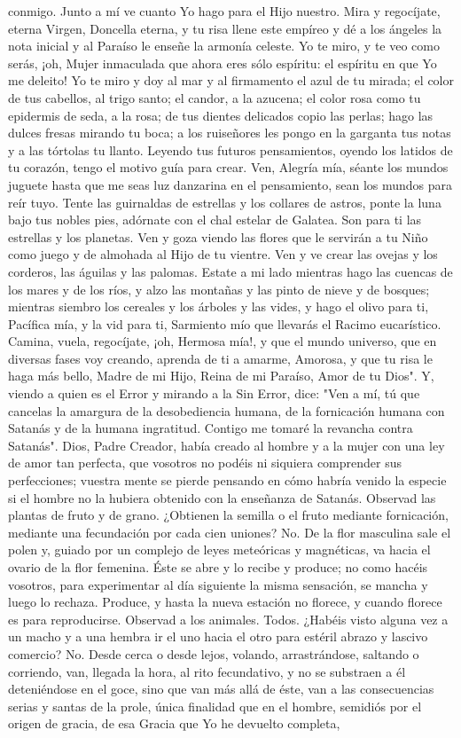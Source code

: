 \documentclass[12pt, twoside, openright]{book} %
\begin{document}
conmigo. Junto a mí ve cuanto Yo hago para el Hijo nuestro. Mira y regocíjate, eterna Virgen, Doncella eterna, y tu risa llene este empíreo y dé a los ángeles la nota inicial y al Paraíso le enseñe la armonía celeste. Yo te miro, y te veo como serás, ¡oh, Mujer inmaculada que ahora eres sólo espíritu: el espíritu en que Yo me deleito! Yo te miro y doy al mar y al firmamento el azul de tu mirada; el color de tus cabellos, al trigo santo; el candor, a la azucena; el color rosa como tu epidermis de seda, a la rosa; de tus dientes delicados copio las perlas; hago las dulces fresas mirando tu boca; a los ruiseñores les pongo en la garganta tus notas y a las tórtolas tu llanto. Leyendo tus futuros pensamientos, oyendo los latidos de tu corazón, tengo el motivo guía para crear. Ven, Alegría mía, séante los mundos juguete hasta que me seas luz danzarina en el pensamiento, sean los mundos para reír tuyo. Tente las guirnaldas de estrellas y los collares de astros, ponte la luna bajo tus nobles pies, adórnate con el chal estelar de Galatea. Son para ti las estrellas y los planetas. Ven y goza viendo las flores que le servirán a tu Niño como juego y de almohada al Hijo de tu vientre. Ven y ve crear las ovejas y los corderos, las águilas y las palomas. Estate a mi lado mientras hago las cuencas de los mares y de los ríos, y alzo las montañas y las pinto de nieve y de bosques; mientras siembro los cereales y los árboles y las vides, y hago el olivo para ti, Pacífica mía, y la vid para ti, Sarmiento mío que llevarás el Racimo eucarístico. Camina, vuela, regocíjate, ¡oh, Hermosa mía!, y que el mundo universo, que en diversas fases voy creando, aprenda de ti a amarme, Amorosa, y que tu risa le haga más bello, Madre de mi Hijo, Reina de mi Paraíso, Amor de tu Dios". Y, viendo a quien es el Error y mirando a la Sin Error, dice: "Ven a mí, tú que cancelas la amargura de la desobediencia humana, de la fornicación humana con Satanás y de la humana ingratitud. Contigo me tomaré la revancha contra Satanás". Dios, Padre Creador, había creado al hombre y a la mujer con una ley de amor tan perfecta, que vosotros no podéis ni siquiera comprender sus perfecciones; vuestra mente se pierde pensando en cómo habría venido la especie si el hombre no la hubiera obtenido con la enseñanza de Satanás. Observad las plantas de fruto y de grano. ¿Obtienen la semilla o el fruto mediante fornicación, mediante una fecundación por cada cien uniones? No. De la flor masculina sale el polen y, guiado por un complejo de leyes meteóricas y magnéticas, va hacia el ovario de la flor femenina. Éste se abre y lo recibe y produce; no como hacéis vosotros, para experimentar al día siguiente la misma sensación, se mancha y luego lo rechaza. Produce, y hasta la nueva estación no florece, y cuando florece es para reproducirse. Observad a los animales. Todos. ¿Habéis visto alguna vez a un macho y a una hembra ir el uno hacia el otro para estéril abrazo y lascivo comercio? No. Desde cerca o desde lejos, volando, arrastrándose, saltando o corriendo, van, llegada la hora, al rito fecundativo, y no se substraen a él deteniéndose en el goce, sino que van más allá de éste, van a las consecuencias serias y santas de la prole, única finalidad que en el hombre, semidiós por el origen de gracia, de esa Gracia que Yo he devuelto completa, 
\end{document}
